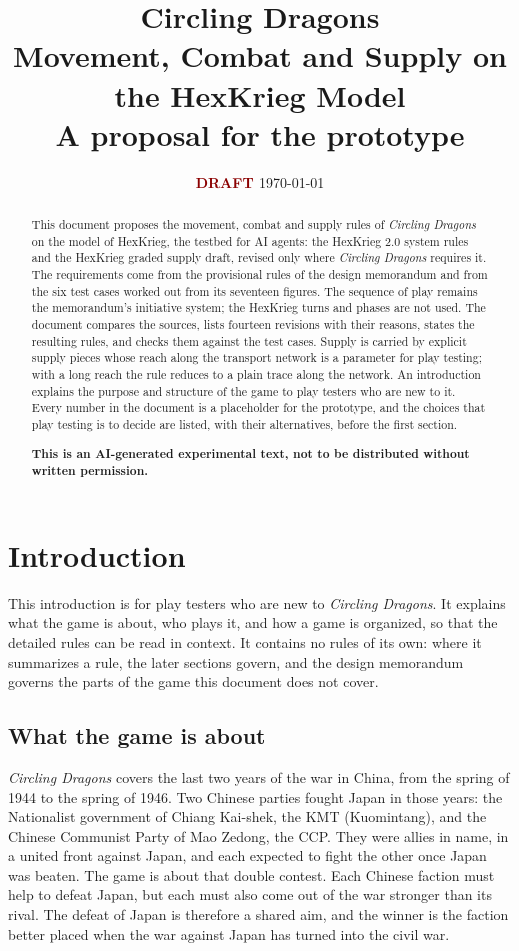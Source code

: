 \documentclass[11pt]{article}
\title{\textbf{Circling Dragons}\\\large Movement, Combat and Supply on the HexKrieg Model\\\normalsize A proposal for the prototype}
\author{}
\date{\textbf{\textcolor{darkred}{DRAFT \myversion}} \today}
\begin{document}
\maketitle
\begin{abstract}
This document proposes the movement, combat and supply rules of \emph{Circling Dragons} on the model of HexKrieg, the testbed for AI agents: the HexKrieg 2.0 system rules and the HexKrieg graded supply draft, revised only where \emph{Circling Dragons} requires it. The requirements come from the provisional rules of the design memorandum and from the six test cases worked out from its seventeen figures. The sequence of play remains the memorandum's initiative system; the HexKrieg turns and phases are not used. The document compares the sources, lists fourteen revisions with their reasons, states the resulting rules, and checks them against the test cases. Supply is carried by explicit supply pieces whose reach along the transport network is a parameter for play testing; with a long reach the rule reduces to a plain trace along the network. An introduction explains the purpose and structure of the game to play testers who are new to it. Every number in the document is a placeholder for the prototype, and the choices that play testing is to decide are listed, with their alternatives, before the first section.

{\bfseries\footnotesize\color{darkred}This is an AI-generated experimental text, not to be
distributed without written permission.}
\end{abstract}
\begingroup\small\tableofcontents\endgroup
\clearpage

\section*{Introduction}
\label{sec:intro}
This introduction is for play testers who are new to \emph{Circling Dragons}. It explains what the game is about, who plays it, and how a game is organized, so that the detailed rules can be read in context. It contains no rules of its own: where it summarizes a rule, the later sections govern, and the design memorandum governs the parts of the game this document does not cover.

\subsection*{What the game is about}
\emph{Circling Dragons} covers the last two years of the war in China, from the spring of 1944 to the spring of 1946. Two Chinese parties fought Japan in those years: the Nationalist government of Chiang Kai-shek, the KMT (Kuomintang), and the Chinese Communist Party of Mao Zedong, the CCP. They were allies in name, in a united front against Japan, and each expected to fight the other once Japan was beaten. The game is about that double contest. Each Chinese faction must help to defeat Japan, but each must also come out of the war stronger than its rival. The defeat of Japan is therefore a shared aim, and the winner is the faction better placed when the war against Japan has turned into the civil war.
\end{document}
